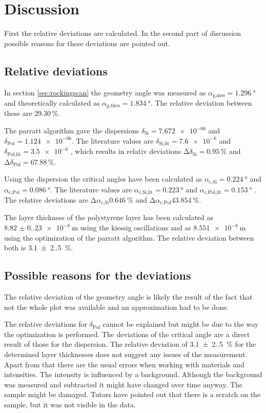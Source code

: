 \section{Discussion}
\label{sec:Discussion}

First the relative deviations are calculated. In the second part of discussion possible reasons for these deviations are pointed out.

\subsection{Relative deviations}
In section \ref{sec:rockingscan} the geometry angle was measured as $\alpha_\text{g,mes}=\qty{1.296}{\degree}$ and theoretically calculated as $\alpha_\text{g,theo}=\qty{1.834}{\degree}$.
The relative deviation between these are 29.30\,\%.\par

The parratt algorithm gave the dispersions $\delta_\text{Si}=\num{7.672e-06}$ and $\delta_\text{Pol}=\num{1.124e-06}$. The literature values are 
$\delta_\text{Si,lit}=\num{7.6e-6}$ and $\delta_\text{Pol,lit}=\num{3.5e-6}$ \cite{V44:xrr_tolan}, which results in relativ deviations $\increment \delta_\text{Si}=0.95\,\%$ 
and $\increment \delta_\text{Pol}=67.88\,\%$.\par

Using the dispersion the critical angles have been calculated as $\alpha_\text{c,Si}=\qty{0.224}{\degree}$ and $\alpha_\text{c,Pol}=\qty{0.086}{\degree}$.
The literature values are $\alpha_\text{c,Si,lit}=\qty{0.223}{\degree}$ and $\alpha_\text{c,Pol,lit}=\qty{0.153}{\degree}$ \cite{V44:xrr_tolan}.
The relative deviations are $\increment \alpha_\text{c,Si}\qty{0.646}{\percent}$ and $\increment \alpha_\text{c,Pol}\qty{43.854}{\percent}$.\par

The layer thickness of the polystyrene layer has been calculated as $\qty{8.82(0.23)e-8}{\m}$ using the kiessig oscillations and as $\qty{8.551e-8}{\m}$ 
using the optimization of the parratt algorithm. The relative deviation between both is \qty{3.1(2.5)}{\percent}.

\subsection{Possible reasons for the deviations}
The relative deviation of the geometry angle is likely the result of the fact that not the whole plot was available and an approximation had to be done.\par
The relative deviations for $\delta_\text{Pol}$ cannot be explained but might be due to the way the optimization is performed.
The deviations of the critical angle are a direct result of those for the dispersion.
The relative deviation of \qty{3.1(2.5)}{\percent} for the determined layer thicknesses does not suggest any issues of the measurement.
Apart from that there are the usual errors when working with materials and intensities. The intensity is influenced by a background. 
Although the background was measured and subtracted it might have changed over time anyway. The sample might be damaged. Tutors have pointed out that there is a scratch on the sample, 
but it was not visible in the data.
